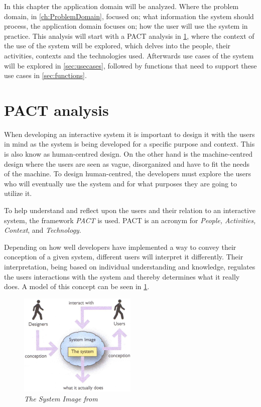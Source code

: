 
In this chapter the application domain will be analyzed.
Where the problem domain, in \cref{ch:ProblemDomain}, focused on; what information the system should process, the application domain focuses on; how the user will use the system in practice.
This analysis will start with a PACT \cite{Benyon} analysis in \cref{sec:PACT}, where the context of the use of the system will be explored, which delves into the people, their activities, contexts and the technologies used.
Afterwards use cases of the system will be explored in \cref{sec:usecases}, followed by functions that need to support these use cases in \cref{sec:functions}.

\section{PACT analysis}\label{sec:PACT}
When developing an interactive system it is important to design it with the users in mind as the system is being developed for a specific purpose and context.
This is also know as human-centred design.
On the other hand is the machine-centred design where the users are seen as vague, disorganized and have to fit the needs of the machine.
To design human-centred, the developers must explore the users who will eventually use the system and for what purposes they are going to utilize it.

To help understand and reflect upon the users and their relation to an interactive system, the framework \textit{PACT} is used.
PACT is an acronym for \textit{People, Activities, Context}, and \textit{Technology}.

Depending on how well developers have implemented a way to convey their conception of a given system, different users will interpret it differently.
Their interpretation, being based on individual understanding and knowledge, regulates the users interactions with the system and thereby determines what it really does.
A model of this concept can be seen in \cref{fig:PACT-SystemImage}.

\begin{figure}[H]
	\centering
	\includegraphics[width=0.5\textwidth]{billeder/SystemImage-Benyon.jpg}
	\caption{\textit{The System Image from \citep[p.~31]{Benyon}}}
	\label{fig:PACT-SystemImage}
\end{figure}


